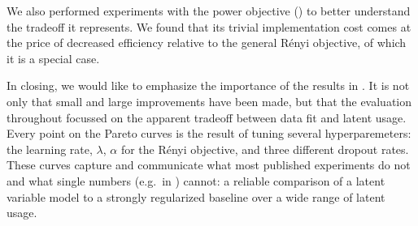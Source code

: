 We also performed experiments with the power objective () to better understand the tradeoff it represents.
We found that its trivial implementation cost comes at the price of decreased efficiency relative to the general Rényi objective, of which it is a special case.

In closing, we would like to emphasize the importance of the results in .
It is not only that small and large improvements have been made, but that the evaluation throughout focussed on the apparent tradeoff between data fit and latent usage.
Every point on the Pareto curves is the result of tuning several hyperparemeters: the learning rate, $\lambda$, $\alpha$ for the Rényi objective, and three different dropout rates.
These curves capture and communicate what most published experiments do not and what single numbers (e.g.\ in ) cannot: a reliable comparison of a latent variable model to a strongly regularized baseline over a wide range of latent usage.

